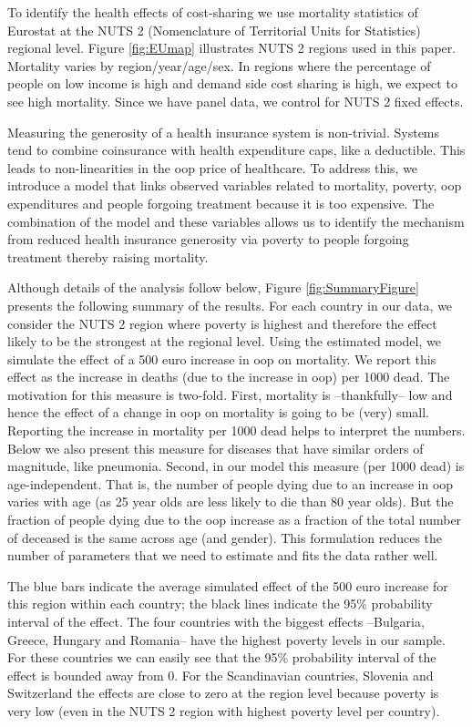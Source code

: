 \documentclass[a4paper,12pt]{article}
\begin{document}
To identify the health effects of cost-sharing we use mortality statistics of Eurostat at the NUTS 2 (Nomenclature of Territorial Units for Statistics) regional level. Figure \ref{fig:EUmap} illustrates NUTS 2 regions used in this paper. Mortality varies by region/year/age/sex. In regions where the percentage of people on low income is high and demand side cost sharing is high, we expect to see high mortality. Since we have panel data, we control for NUTS 2 fixed effects.

Measuring the generosity of a health insurance system is non-trivial. Systems tend to combine coinsurance with health expenditure caps, like a deductible. This leads to non-linearities in the oop price of healthcare. To address this, we introduce a model that links observed variables related to mortality, poverty, oop expenditures and people forgoing treatment because it is too expensive. The combination of the model and these variables allows us to identify the mechanism from reduced health insurance generosity via poverty to people forgoing treatment thereby raising mortality.

Although details of the analysis follow below, Figure \ref{fig:SummaryFigure} presents the following summary of the results. For each country in our data, we consider the NUTS 2 region where poverty is highest and therefore the effect likely to be the strongest at the regional level. Using the estimated model, we simulate the effect of a 500 euro increase in oop on mortality. We report this effect as the increase in deaths (due to the increase in oop) per 1000 dead. The motivation for this measure is two-fold. First, mortality is --thankfully-- low and hence the effect of a change in oop on mortality is going to be (very) small. Reporting the increase in mortality per 1000 dead helps to interpret the numbers. Below we also present this measure for diseases that have similar orders of magnitude, like pneumonia. Second, in our model this measure (per 1000 dead) is age-independent. That is, the number of people dying due to an increase in oop varies with age (as 25 year olds are less likely to die than 80 year olds). But the fraction of people dying due to the oop increase as a fraction of the total number of deceased is the same across age (and gender). This formulation reduces the number of parameters that we need to estimate and fits the data rather well. 

The blue bars indicate the average simulated effect of the 500 euro increase for this region within each country; the black lines indicate the 95\% probability interval of the effect. The four countries with the biggest effects --Bulgaria, Greece, Hungary and Romania-- have the highest poverty levels in our sample. For these countries we can easily see that the 95\% probability interval of the effect is bounded away from 0. For the Scandinavian countries, Slovenia and Switzerland the effects are close to zero at the region level because poverty is very low (even in the NUTS 2 region with highest poverty level per country). 
\end{document}
